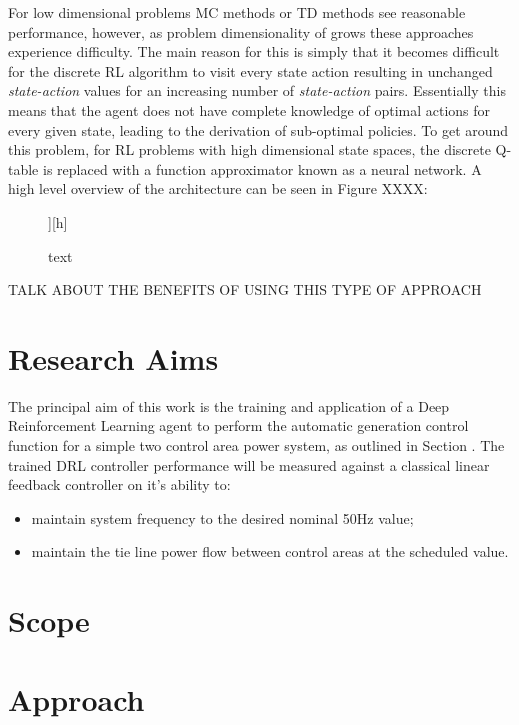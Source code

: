 \documentclass[12pt, a4paper]{article}
\begin{document}
For low dimensional problems MC methods or TD methods see reasonable performance, however, as problem dimensionality of grows these approaches experience difficulty. The main reason for this is simply that it becomes difficult for the discrete RL algorithm to visit every state action resulting in unchanged \textit{state-action} values for an increasing number of \textit{state-action} pairs. Essentially this means that the agent does not have complete knowledge of optimal actions for every given state, leading to the derivation of sub-optimal policies. To get around this problem, for RL problems with high dimensional state spaces, the discrete Q-table is replaced with a function approximator known as a neural network. A high level overview of the architecture can be seen in Figure XXXX:
\begin{figure}][h]
\centering
\caption{text}
\end{figure}



TALK ABOUT THE BENEFITS OF USING THIS TYPE OF APPROACH


\section{Research Aims}

The principal aim of this work is the training and application of a Deep Reinforcement Learning agent to perform the automatic generation control function for a simple two control area power system, as outlined in Section . The trained DRL controller performance will be measured against a classical linear feedback controller on it's ability to:
\begin{itemize}
	\item maintain system frequency to the desired nominal 50$\si{\hertz}$ value;
	\item maintain the tie line power flow between control areas at the scheduled value.
\end{itemize}


\section{Scope}


\section{Approach}
\end{document}
